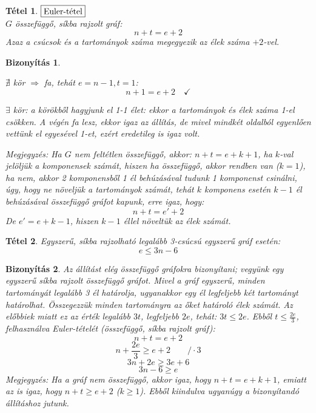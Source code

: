 \documentclass[a4paper,12pt,twoside]{book}
\newtheorem{tetel}{Tétel}[chapter]
\newtheorem{biz}{Bizonyítás}[chapter]
\theoremstyle{break}
\newtheorem{bizNL}[biz]{Bizonyítás}
\begin{document}
\begin{tetel} $\boxed{$Euler-tétel$}$\\
 $G$ összefüggő, síkba rajzolt gráf:
 \[n+t = e+2\]
 Azaz a csúcsok és a tartományok száma megegyezik az élek száma $+2$-vel.
\end{tetel}
\begin{bizNL}
 \begin{enumerate*}
  \item $\nexists$ kör $\Rightarrow$ fa, tehát $e=n-1, t=1$:
  \[n+1 = e+2 \quad \checkmark\]
  \item $\exists$ kör: a körökből hagyjunk el 1-1 élet: ekkor a tartományok és élek száma 1-el csökken. A végén fa lesz, ekkor igaz az állítás, de mivel mindkét oldalból egyenlően vettünk el egyesével 1-et, ezért eredetileg is igaz volt.
 \end{enumerate*}
 \emph{Megjegyzés}: Ha $G$ nem feltétlen összefüggő, akkor: $n+t = e+k+1$, ha $k$-val jelöljük a komponensek számát, hiszen ha összefüggő, akkor rendben van ($k=1$), ha nem, akkor 2 komponensből 1 él behúzásával tudunk 1 komponenst csinálni, úgy, hogy ne növeljük a tartományok számát, tehát $k$ komponens esetén $k-1$ él behúzásával összefüggő gráfot kapunk, erre igaz, hogy:
  \[n+t = e'+2\]
 De $e' = e+k-1$, hiszen $k-1$ éllel növeltük az élek számát.
\end{bizNL}

\begin{tetel}
 Egyszerű, síkba rajzolható legalább 3-csúcsú egyszerű gráf esetén:
  \[e \leqslant 3n-6\]
\end{tetel}
\begin{biz} Az állítást elég összefüggő gráfokra bizonyítani; vegyünk egy egyszerű síkba rajzolt összefüggő gráfot. Mivel a gráf egyszerű, minden tartományát legalább 3 él határolja, ugyanakkor egy él legfeljebb két tartományt határolhat. Összegezzük minden tartományra az őket határoló élek számát. Az előbbiek miatt ez az érték legalább $3t$, legfeljebb $2e$, tehát: $3t \leqslant 2e$. Ebből $t \leqslant \frac{2e}{3}$, felhasználva Euler-tételét (összefüggő, síkba rajzolt gráf):
\[n+t = e+2\]
\[n+\frac{2e}{3} \geqslant e+2 \qquad /\cdot 3 \]
\[3n+2e \geqslant 3e+6\]
\[3n-6 \geqslant e\]
\emph{Megjegyzés}: Ha a gráf nem összefüggő, akkor igaz, hogy $n+t = e+k+1$, emiatt az is igaz, hogy $n+t \geqslant e+2$ ($k\geqslant 1$). Ebből kiindulva ugyanúgy a bizonyítandó állításhoz jutunk.
\end{biz}
\end{document}

